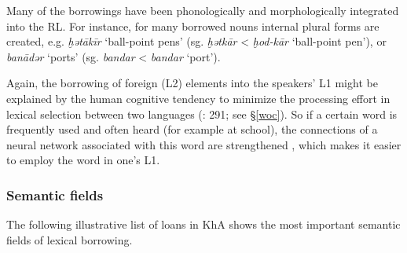 \documentclass[output=paper,nonflat]{langsci/langscibook}
\begin{document}
Many of the  borrowings have been phonologically and morphologically integrated into the {RL}. For instance, for many borrowed  nouns  {internal plural} forms are created, e.g. \textit{ḫətākīr} ‘ball-point pens’ (sg. \textit{ḫətkār} <  \textit{ḫod-kār} ‘ball-point pen’), or \textit{banādər} ‘ports’ (sg. \textit{bandar} <  \textit{bandar} ‘port’).

Again, the borrowing of foreign (L2) elements into the speakers’ L1 might be explained by the human cognitive tendency to minimize the processing effort in lexical selection between two languages (\citealt{Lucas2012}: 291; see §\ref{woc}). So if a certain  word is frequently used and often heard (for example at school), the connections of a neural network associated with this word are strengthened \citep[291]{Lucas2012}, which makes it easier to employ the word in one’s L1. 


\subsubsection{Semantic fields}

The following illustrative list of  loans in KhA shows the most important semantic fields of lexical borrowing.
\end{document}

